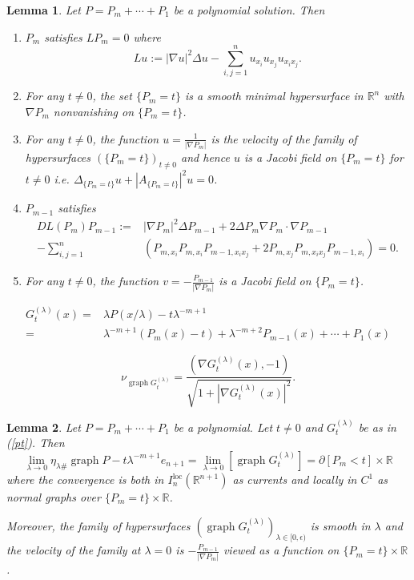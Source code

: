 \documentclass[10pt,a4paper]{amsart}
\newtheorem{lemma}{Lemma}
\newcommand{\R}{\mathbb{R}}
\DeclareMathOperator{\graph}{graph}
\newcommand{\loc}{\mathrm{loc}}
\begin{document}
\begin{lemma}\label{expansion}
	Let $P=P_m+\cdots+P_1$ be a polynomial solution. Then 
	\begin{enumerate}
		
		\item[(i)] $P_m$ satisfies $LP_m=0$ where \[Lu:=|\nabla u|^2\Delta u-\sum_{i,j=1}^nu_{x_i}u_{x_j}u_{x_ix_j}.\]
		
		\item[(ii)] For any $t\neq 0$, the set $\{P_m=t\}$ is a smooth minimal hypersurface in $\R^n$ with $\nabla P_m$ nonvanishing on $\{P_m=t\}$.
		
		\item[(iii)] For any $t\neq 0$, the function $u=\frac{1}{|\nabla P_m|}$ is the velocity of the family of hypersurfaces $(\{P_m=t\})_{t\neq0}$ and hence $u$ is a Jacobi field on $\{P_m=t\}$ for $t\neq 0$ i.e. $\Delta_{\{P_m=t\}}u+|A_{\{P_m=t\}}|^2u=0$.
		
		\item[(iv)] $P_{m-1}$ satisfies 
		\begin{equation}
			\label{m-1}\begin{aligned}
				DL(P_m)P_{m-1}:=&|\nabla P_m|^2\Delta P_{m-1}+2\Delta P_m\nabla P_m\cdot \nabla P_{m-1}\\
				-\sum_{i,j=1}^n&\left( P_{m,x_i}P_{m,x_i}P_{m-1,x_ix_j}+2P_{m,x_j}P_{m,x_ix_j}P_{m-1,x_i}\right)=0.
			\end{aligned}
		\end{equation}
		\item[(v)] For any $t\neq 0$, the function $v=-\frac{P_{m-1}}{|\nabla P_m|}$ is a Jacobi field on $\{P_m=t\}$.
	\end{enumerate}
\end{lemma}

\begin{equation}\label{pt}
	\begin{aligned}
		G_t^{(\lambda)}(x)=&\lambda P(x/\lambda)-t\lambda^{-m+1}\\=&\lambda^{-m+1}(P_m(x)-t)+\lambda^{-m+2}P_{m-1}(x)+\cdots+P_1(x)
	\end{aligned}
\end{equation}

\begin{equation}\label{normal}
	\nu_{\graph G_t^{(\lambda)}}=\frac{(\nabla G_t^{(\lambda)}(x),-1)}{\sqrt{1+|\nabla G_t^{(\lambda)}(x)|^2}}.
\end{equation}

\begin{lemma}\label{convgr}
Let $P=P_m+\cdots+P_1$ be a polynomial. Let $t\neq 0$ and $G_t^{(\lambda)}$ be as in (\ref{pt}). Then \[\lim_{\lambda\to0}\eta_{\lambda\#}\graph P-t\lambda^{-m+1}e_{n+1}=\lim_{\lambda\to0}\left[\graph G_t^{(\lambda)}\right] = \partial[P_m<t]\times \R\] where the convergence is both in $I_{n}^\loc(\R^{n+1})$ as currents and locally in $C^1$ as normal graphs over $\{P_m=t\}\times\R$.

Moreover, the family of hypersurfaces $(\graph G_t^{(\lambda)})_{\lambda\in [0,\epsilon)}$ is smooth in $\lambda$ and the velocity of the family at $\lambda=0$ is $-\frac{P_{m-1}}{|\nabla P_m|}$ viewed as a function on $\{P_m=t\}\times\R$.
\end{lemma}
\end{document}
